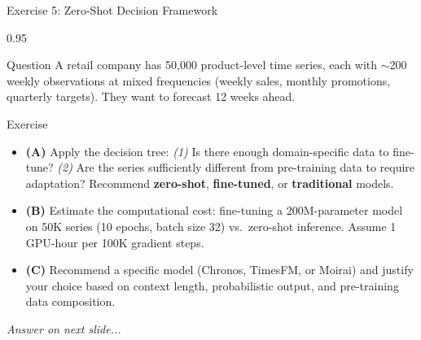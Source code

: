 \documentclass[9pt, aspectratio=169, t]{beamer}
\begin{document}
\begin{frame}{Exercise 5: Zero-Shot Decision Framework}
    \begin{cminipage}{0.95\textwidth}
    {\small
    \begin{alertblock}{Question}
        A retail company has 50{,}000 product-level time series, each with $\sim$200 weekly observations at mixed frequencies (weekly sales, monthly promotions, quarterly targets). They want to forecast 12 weeks ahead.
    \end{alertblock}

    \vspace{0.1cm}

    \begin{block}{Exercise}
        \begin{itemize}\setlength{\itemsep}{3pt}
            \item \textcolor{MainBlue}{\textbf{(A)}} Apply the decision tree: \textit{(1)} Is there enough domain-specific data to fine-tune? \textit{(2)} Are the series sufficiently different from pre-training data to require adaptation? Recommend \textbf{zero-shot}, \textbf{fine-tuned}, or \textbf{traditional} models.
            \item \textcolor{MainBlue}{\textbf{(B)}} Estimate the computational cost: fine-tuning a 200M-parameter model on 50K series (10 epochs, batch size 32) vs.\ zero-shot inference. Assume 1 GPU-hour per 100K gradient steps.
            \item \textcolor{MainBlue}{\textbf{(C)}} Recommend a specific model (Chronos, TimesFM, or Moirai) and justify your choice based on context length, probabilistic output, and pre-training data composition.
        \end{itemize}
    \end{block}

    \vspace{0.1cm}

    \begin{center}
        \textit{Answer on next slide...}
    \end{center}
    }
    \end{cminipage}
\end{frame}
\end{document}
